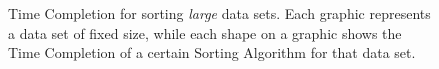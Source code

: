 \begin{figure}[!ht]
	\centering
  	\hspace*{20pt}  
  	
	\caption{Time Completion for sorting \textit{large} data sets. Each graphic represents a data set of fixed size, while each shape on a graphic shows the Time Completion of a certain Sorting Algorithm for that data set.}
	\label{NxTxA-large}
\end{figure} 

